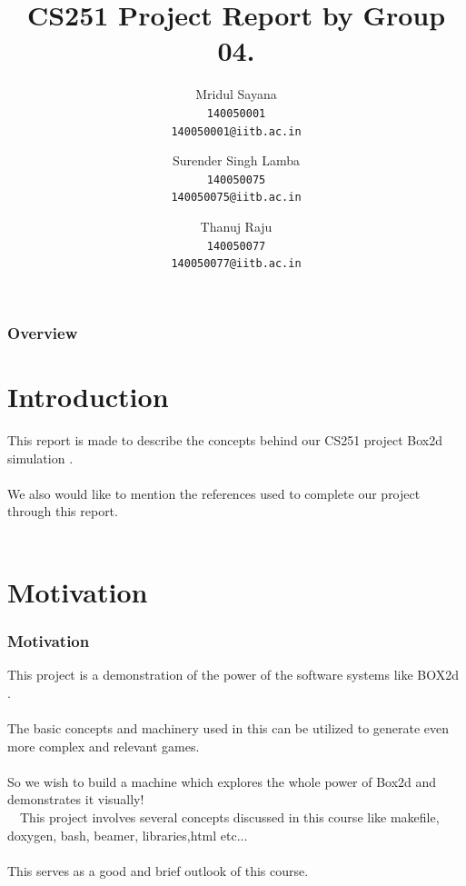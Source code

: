 \documentclass[t,compress,11pt,xcolor=dvipsnames]{beamer}
\title{ CS251 Project Report by Group 04.}
\author{
Mridul Sayana\\
\texttt{140050001}\\
\texttt{140050001@iitb.ac.in}\\
\and
Surender Singh Lamba\\
\texttt{140050075}\\
\texttt{140050075@iitb.ac.in}\\
\and
Thanuj Raju\\
\texttt{140050077}\\
\texttt{140050077@iitb.ac.in}
}
\begin{document}
\maketitle
\begin{frame}
\frametitle{Overview}
\tableofcontents
\end{frame}
\section{Introduction}
\begin{frame}
This report is made to describe the concepts behind our CS251 project Box2d simulation .\\~\\
We also would like to mention the references used to complete our project through this report.\\~\\
\end{frame}
%
\section{Motivation}
\begin{frame}
\frametitle{Motivation}
This project is a demonstration of the power of the software
systems like BOX2d .\\~\\

 The basic concepts and machinery used in this can be utilized to generate even more complex and relevant games.\\~\\

So we wish to build a machine which explores the whole power of Box2d and demonstrates it visually!\\~\
This project involves several concepts discussed in this course like
makefile, doxygen, bash, beamer, libraries,html etc...\\~\\
This serves as a good and brief outlook of this course.\\~\\
\end{frame}
\end{document}
